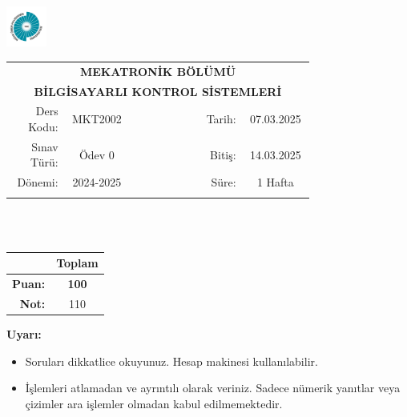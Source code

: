 \newcommand\UniversiteAdi{Niğde Ömer Halisdemir Üniversitesi}
\newcommand\BolumAdi{MEKATRONİK BÖLÜMÜ}
\newcommand\DersKodu{MKT2002}
\newcommand\DersAdi{BİLGİSAYARLI KONTROL SİSTEMLERİ}
\newcommand\SinavAdi{Ödev 0}
\newcommand\SinavTarihi{07.03.2025}
\newcommand\SinavSaati{14.03.2025}
\newcommand\SinavSuresi{1 Hafta}

\pagestyle{fancy}
\fancyhf{} %
\noindent \includegraphics[width=0.1\textwidth]{logo}
\begin{tabular}{
    p{0.15\linewidth}
    p{0.15\linewidth}
    p{0.2\linewidth}
    p{0.1\linewidth}
    p{0.15\linewidth}}
    \multicolumn{5}{c}{\textbf{\BolumAdi}}\\
    \multicolumn{5}{c}{\textbf{\DersAdi}}\\\hline
    \multicolumn{1}{|r|}{Ders Kodu:}&
    \multicolumn{1}{|c|}{\DersKodu}&
    \multicolumn{1}{|c|}{}& 
    \multicolumn{1}{|r|}{Tarih:}&
    \multicolumn{1}{|c|}{\SinavTarihi} \\\hline
    \multicolumn{1}{|r|}{Sınav Türü:}&
    \multicolumn{1}{|c|}{\SinavAdi}&  
    \multicolumn{1}{|c|}{}&
    \multicolumn{1}{|r|}{Bitiş:}&
    \multicolumn{1}{|c|}{\SinavSaati}\\\hline
    \multicolumn{1}{|r|}{Dönemi:}&
    \multicolumn{1}{|c|}{2024-2025}&
    \multicolumn{1}{|c|}{}&
    \multicolumn{1}{|r|}{Süre:}&
    \multicolumn{1}{|c|}{\SinavSuresi} \\\hline
    &&&&\\
\end{tabular}\\\\
\noindent\begin{center}
\begin{tabular}{|r|c|}\hline
    &\textbf{Toplam}\\\hline
    \textbf{Puan:} &\textbf{100}\\\hline
    \textbf{Not:}  &110\\\hline
\end{tabular}\end{center}
\noindent\textbf{Uyarı:}
\begin{itemize}\bfseries
    \item Soruları dikkatlice okuyunuz. Hesap makinesi kullanılabilir.
    \item İşlemleri atlamadan ve ayrıntılı olarak veriniz. Sadece nümerik yanıtlar veya çizimler ara işlemler olmadan kabul edilmemektedir.
\end{itemize}
